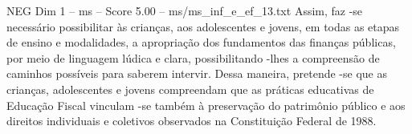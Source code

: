 \begin{textsample}{NEG Dim 1 – ms – Score 5.00 – ms/ms\_inf\_e\_ef\_13.txt}
Assim, faz -se necessário possibilitar às crianças, aos adolescentes e jovens, em todas as etapas de ensino e modalidades, a apropriação dos fundamentos das finanças públicas, por meio de linguagem lúdica e clara, possibilitando -lhes a compreensão de caminhos possíveis para saberem intervir.
Dessa maneira, pretende -se que as crianças, adolescentes e jovens compreendam que as práticas educativas de Educação Fiscal vinculam -se também à preservação do patrimônio público e aos direitos individuais e coletivos observados na Constituição Federal de 1988.

\end{textsample}

